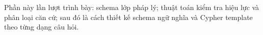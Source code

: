 \documentclass[../DoAn.tex]{subfiles}
\begin{document}
Phần này lần lượt trình bày: schema lớp pháp lý; thuật toán kiểm tra hiệu lực và phân loại căn cứ; sau đó là cách thiết kế schema ngữ nghĩa và Cypher template theo từng dạng câu hỏi.




\end{document}
